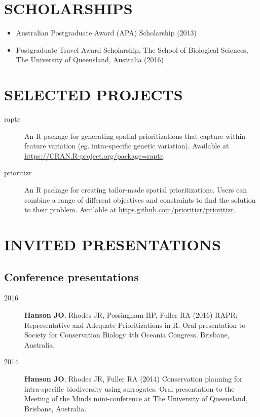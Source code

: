 \documentclass[12pt,a4paper]{article}
\begin{document}
\section*{SCHOLARSHIPS}
\begin{itemize}

\item Australian Postgraduate Award (APA) Scholarship (2013)

\item Postgraduate Travel Award Scholarship, The School of Biological Sciences, The University of Queensland, Australia (2016)

\end{itemize}

\section*{SELECTED PROJECTS}
\begin{description}

\item[raptr] An R package for generating spatial prioritizations that capture within feature variation (eg. intra-specific genetic variation). Available at \url{https://CRAN.R-project.org/package=raptr}.

\item[prioritizr] An R package for creating tailor-made spatial prioritizations. Users can combine a range of different objectives and constraints to find the solution to their problem. Available at \url{https.github.com/prioritizr/prioritizr}.

\end{description}

\clearpage

\section*{INVITED PRESENTATIONS}
\subsection*{Conference presentations}
\begin{description}

\item[2016] \textbf{Hanson JO}, Rhodes JR, Possingham HP, Fuller RA (2016) RAPR: Representative and Adequate Prioritizations in R. Oral presentation to Society for Conservation Biology 4th Oceania Congress, Brisbane, Australia.

\item[2014] \textbf{Hanson JO}, Rhodes JR, Fuller RA (2014) Conservation planning for intra-specific biodiversity using surrogates. Oral presentation to the Meeting of the Minds mini-conference at The University of Queensland, Brisbane, Australia.

\end{description}
\end{document}
